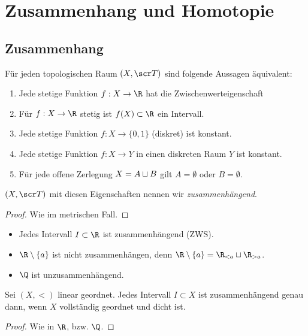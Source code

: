 \chapter{Zusammenhang und Homotopie}


\section{Zusammenhang}

\begin{st}
	Für jeden topologischen Raum $(X, \scr T)$ sind folgende Aussagen äquivalent:
	\begin{enumerate}[(1)]
		\item
			Jede stetige Funktion $f: X \to \R$ hat die Zwischenwerteigenschaft
		\item
			Für $f: X \to \R$ stetig ist $f(X) \subset \R$ ein Intervall.
		\item
			Jede stetige Funktion $f: X \to \{0,1\}$ (diskret) ist konstant.
		\item
			Jede stetige Funktion $f: X \to Y$ in einen diskreten Raum $Y$ ist konstant.
		\item
			Für jede offene Zerlegung $X = A \sqcup B$ gilt $A = \emptyset$ oder $B = \emptyset$.
	\end{enumerate}
	$(X, \scr T)$ mit diesen Eigenschaften nennen wir \emph{zusammenhängend}.
	\begin{proof}
		Wie im metrischen Fall.
	\end{proof}
\end{st}

\begin{ex}
	\begin{itemize}
		\item
			Jedes Intervall $I \subset \R$ ist zusammenhängend (ZWS).
		\item
			$\R \setminus \{a\}$ ist nicht zusammenhängen, denn $\R \setminus \{a\} = \R_{<a} \dunion \R_{>a}$.
		\item
			$\Q$ ist unzusammenhängend.
	\end{itemize}
\end{ex}

\begin{st}
	Sei $(X, <)$ linear geordnet.
	Jedes Intervall $I \subset X$ ist zusammenhängend genau dann, wenn $X$ vollständig geordnet und dicht ist.
	\begin{proof}
		Wie in $\R$, bzw. $\Q$.
	\end{proof}
\end{st}

